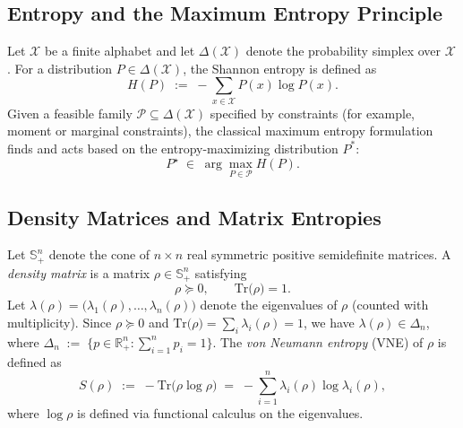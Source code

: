\documentclass{article}
\theoremstyle{plain}
\theoremstyle{definition}
\begin{document}
\subsection{Entropy and the Maximum Entropy Principle}
\label{subsec:prelim:classical}
Let $\mathcal{X}$ be a finite alphabet and let $\Delta(\mathcal{X})$ denote the
probability simplex over $\mathcal{X}$. For a distribution
$P\in\Delta(\mathcal{X})$, the Shannon entropy is defined as
\begin{equation}
H(P)\;:=\;-\sum_{x\in\mathcal{X}} P(x)\log P(x).
\label{eq:shannon-entropy}
\end{equation}
Given a feasible family $\mathcal{P}\subseteq\Delta(\mathcal{X})$ specified by
constraints (for example, moment or marginal constraints), the classical
maximum entropy formulation \cite{Jaynes1957} finds and acts based on the entropy-maximizing distribution $P^*$:
\begin{equation}
P^\star \;\in\; \arg\max_{P\in\mathcal{P}} H(P).
\label{eq:maxent-classical}
\end{equation}

\subsection{Density Matrices and Matrix Entropies}
\label{subsec:prelim:matrix}
Let $\mathbb{S}^n_+$ denote the cone of $n\times n$ real symmetric positive
semidefinite matrices. A \emph{density matrix} is a matrix
$\rho\in\mathbb{S}^n_+$ satisfying
\begin{equation}
\rho \succeq 0,
\qquad
\mathrm{Tr}\bigl(\rho\bigr)=1.
\label{eq:density-matrix}
\end{equation}
Let $\lambda(\rho)=\bigl(\lambda_1(\rho),\ldots,\lambda_n(\rho)\bigr)$ denote the
eigenvalues of $\rho$ (counted with multiplicity). Since
$\rho\succeq 0$ and $\mathrm{Tr}\bigl(\rho\bigr)=\sum_i \lambda_i(\rho)=1$, we have
$\lambda(\rho)\in\Delta_n$, where $\Delta_n \;:=\; \bigl\{p\in\mathbb{R}^n_+ : \sum_{i=1}^n p_i = 1 \bigr\}$. The \emph{von Neumann entropy} (VNE) of $\rho$ is defined as
\begin{equation}
S(\rho)\;:=\;-\mathrm{Tr}\!\bigl(\rho \log \rho\bigr)
\;=\;-\sum_{i=1}^n \lambda_i(\rho)\log \lambda_i(\rho),
\label{eq:vne}
\end{equation}
where $\log \rho$ is defined via functional calculus on the eigenvalues.
\end{document}
